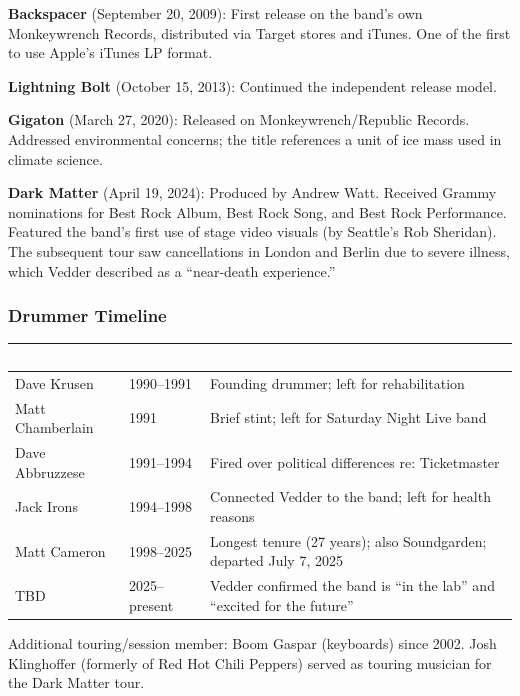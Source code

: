 \documentclass[11pt,letterpaper]{article}
\newcommand{\tableheader}[1]{\textbf{\sffamily\textcolor{white}{#1}}}
\begin{document}
\textbf{Backspacer} (September 20, 2009): First release on the band's own Monkeywrench Records, distributed via Target stores and iTunes. One of the first to use Apple's iTunes LP format.

\textbf{Lightning Bolt} (October 15, 2013): Continued the independent release model.

\textbf{Gigaton} (March 27, 2020): Released on Monkeywrench/Republic Records. Addressed environmental concerns; the title references a unit of ice mass used in climate science.

\textbf{Dark Matter} (April 19, 2024): Produced by Andrew Watt. Received Grammy nominations for Best Rock Album, Best Rock Song, and Best Rock Performance. Featured the band's first use of stage video visuals (by Seattle's Rob Sheridan). The subsequent tour saw cancellations in London and Berlin due to severe illness, which Vedder described as a ``near-death experience.''

\subsubsection{Drummer Timeline}

\begin{center}
\begin{tabularx}{\textwidth}{L{3.5cm}L{3cm}X}
\toprule
{}
\tableheader{Drummer} & \tableheader{Tenure} & \tableheader{Context} \\
\midrule
Dave Krusen & 1990--1991 & Founding drummer; left for rehabilitation \\
Matt Chamberlain & 1991 & Brief stint; left for Saturday Night Live band \\
Dave Abbruzzese & 1991--1994 & Fired over political differences re: Ticketmaster \\
Jack Irons & 1994--1998 & Connected Vedder to the band; left for health reasons \\
Matt Cameron & 1998--2025 & Longest tenure (27 years); also Soundgarden; departed July 7, 2025 \\
TBD & 2025--present & Vedder confirmed the band is ``in the lab'' and ``excited for the future'' \\
\bottomrule
\end{tabularx}
\end{center}

Additional touring/session member: Boom Gaspar (keyboards) since 2002. Josh Klinghoffer (formerly of Red Hot Chili Peppers) served as touring musician for the Dark Matter tour.
\end{document}
